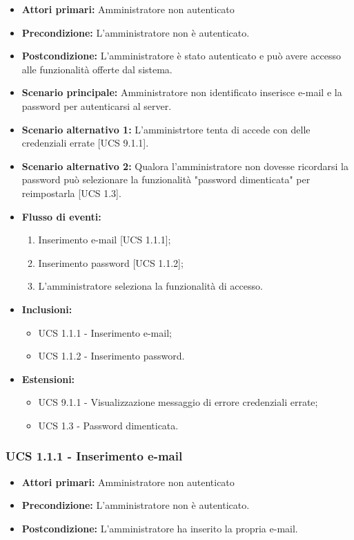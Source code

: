 \begin{itemize}
\item \textbf{Attori primari:} Amministratore non autenticato
\item \textbf{Precondizione:} L'amministratore non è autenticato.
\item \textbf{Postcondizione:} L'amministratore è stato autenticato e può avere accesso alle funzionalità offerte dal sistema.
\item \textbf{Scenario principale:} Amministratore non identificato inserisce e-mail e la password per autenticarsi al server.
\item \textbf{Scenario alternativo 1:} L'amministrtore tenta di accede con delle credenziali errate [UCS 9.1.1].
\item \textbf{Scenario alternativo 2:} Qualora l'amministratore non dovesse ricordarsi la password può selezionare la funzionalità "password dimenticata" per reimpostarla [UCS 1.3].
\item \textbf{Flusso di eventi:}
    \begin{enumerate}
        \item Inserimento e-mail [UCS 1.1.1];
        \item Inserimento password [UCS 1.1.2];
        \item L'amministratore seleziona la funzionalità di accesso.
    \end{enumerate}
    \item \textbf{Inclusioni:}
	\begin{itemize}		
		\item UCS 1.1.1 - Inserimento e-mail;
		\item UCS 1.1.2 - Inserimento password.
	\end{itemize}
    \item \textbf{Estensioni:}
    \begin{itemize}
		\item UCS 9.1.1 - Visualizzazione messaggio di errore credenziali errate;
		\item UCS 1.3 - Password dimenticata.
	\end{itemize}
\end{itemize}

\subsubsection{UCS 1.1.1 - Inserimento e-mail}%
\begin{itemize}
\item \textbf{Attori primari:} Amministratore non autenticato
\item \textbf{Precondizione:} L'amministratore non è autenticato.
\item \textbf{Postcondizione:} L'amministratore ha inserito la propria e-mail.
\end{itemize}

